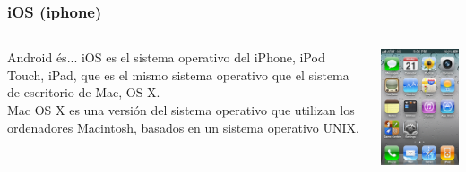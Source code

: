 \documentclass[colorlinks,10pt]{beamer}
\begin{document}
\begin{frame}
  \frametitle{iOS (iphone)}
  
  \begin{columns}
    \begin{column}{0.6\textwidth}
      \begin{block}{Android és...}
        iOS es el sistema operativo del iPhone, iPod Touch, iPad, que es el mismo sistema operativo que el sistema de escritorio de Mac, OS X. \\
        Mac OS X es una versión del sistema operativo que utilizan los ordenadores Macintosh, basados en un sistema operativo UNIX. 
      \end{block}
    \end{column}
    \begin{column}{0.4\textwidth}
        \begin{center}
    \includegraphics[width=0.9\columnwidth]{figs/ios} \\
  \end{center}
    \end{column}
  \end{columns}
\end{frame}
\end{document}
